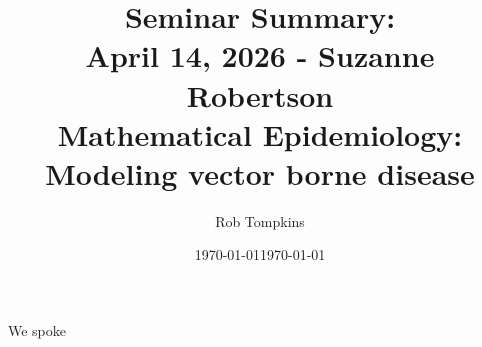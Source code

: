 \documentclass[12pt]{amsart}
\title{Seminar Summary:\\April 14, 2026 - Suzanne Robertson\\Mathematical Epidemiology: Modeling vector borne disease}
\author{Rob Tompkins}
\date{\today}
\theoremstyle{conjecture}
\theoremstyle{definition}
\theoremstyle{question}
\theoremstyle{theorem}
\begin{document}
    \maketitle
    \date{\today}
    \begin{onehalfspace}
        We spoke 
    \end{onehalfspace}
\end{document}
